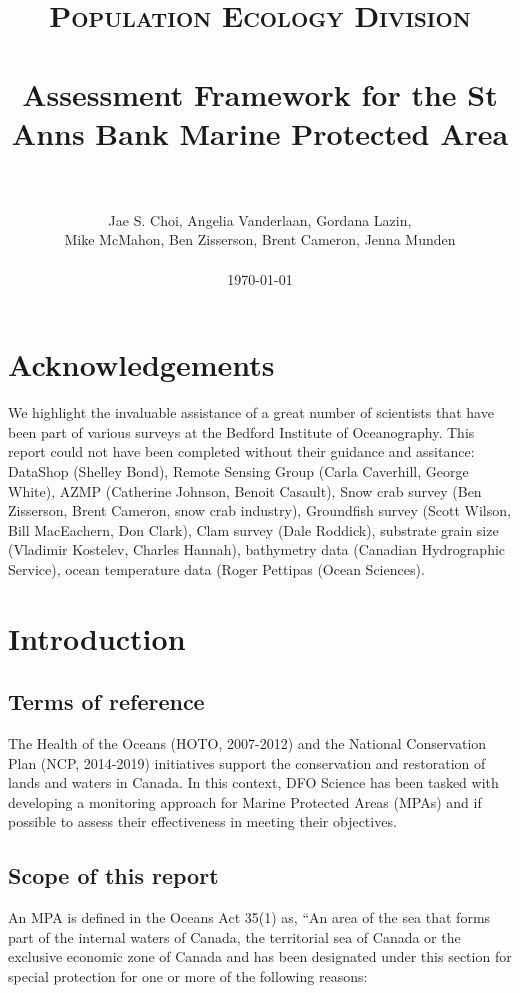 \documentclass[letterpaper,portrait,12pt]{scrartcl}
\title{
		\usefont{OT1}{bch}{b}{n}
		\normalfont \normalsize \textsc{Population Ecology Division} \\ [25pt]
		\horrule{0.5pt} \\[0.4cm]
		\huge Assessment Framework for the St Anns Bank Marine Protected Area  \\
		\horrule{2pt} \\[0.5cm]
}
\author{
		\normalfont \normalsize  Jae S. Choi, Angelia Vanderlaan, Gordana Lazin, \\
    \normalfont \normalsize  Mike McMahon,  Ben Zisserson, Brent Cameron, Jenna Munden \\ 		
    \\
    \normalsize \today
}
\date{}
\numberwithin{equation}{section}		%
\numberwithin{figure}{section}			%
\numberwithin{table}{section}				%
\begin{document}
\maketitle

\setcounter{tocdepth}{2} %
\setcounter{secnumdepth}{3} %
\tableofcontents 

\section*{Acknowledgements}

We highlight the invaluable assistance of a great number of scientists that have been part of various surveys at the Bedford Institute of Oceanography. This report could not have been completed without their guidance and assitance: DataShop (Shelley Bond), Remote Sensing Group (Carla Caverhill, George White), AZMP (Catherine Johnson, Benoit Casault), Snow crab survey (Ben Zisserson, Brent Cameron, snow crab industry), Groundfish survey (Scott Wilson, Bill MacEachern, Don Clark), Clam survey (Dale Roddick), substrate grain size (Vladimir Kostelev, Charles Hannah), bathymetry data (Canadian Hydrographic Service), ocean temperature data (Roger Pettipas (Ocean Sciences).


\section{Introduction}
\subsection{Terms of reference}

The Health of the Oceans (HOTO, 2007-2012) and the National Conservation Plan (NCP, 2014-2019) initiatives support the conservation and restoration of lands and waters in Canada. In this context, DFO Science has been tasked with developing a monitoring approach for Marine Protected Areas (MPAs) and if possible to assess their effectiveness in meeting their objectives. 


\subsection{Scope of this report}

An MPA is defined in the Oceans Act 35(1) as, {``}An area of the sea that forms part of the internal waters of Canada, the territorial sea of Canada or the exclusive economic zone of Canada and has been designated under this section for special protection for one or more of the following reasons: 
\end{document}
